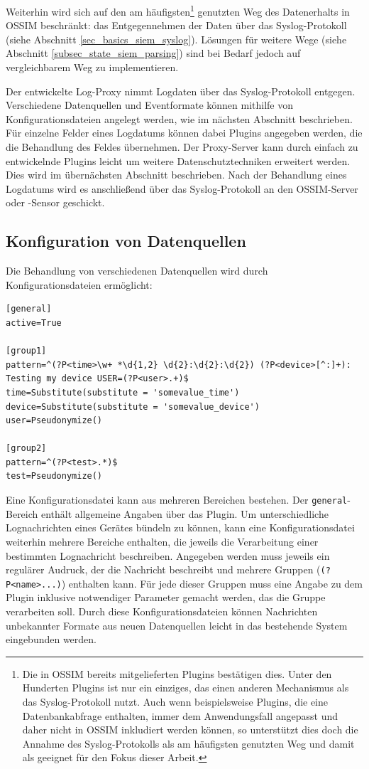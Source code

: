 Weiterhin wird sich auf den am häufigsten\footnote{
  Die in OSSIM bereits mitgelieferten Plugins bestätigen dies. Unter den Hunderten Plugins ist nur ein einziges, das einen anderen Mechanismus als das Syslog-Protokoll nutzt. Auch wenn beispielsweise Plugins, die eine Datenbankabfrage enthalten, immer dem Anwendungsfall angepasst und daher nicht in OSSIM inkludiert werden können, so unterstützt dies doch die Annahme des Syslog-Protokolls als am häufigsten genutzten Weg und damit als geeignet für den Fokus dieser Arbeit.
} genutzten Weg des Datenerhalts in OSSIM beschränkt: das Entgegennehmen der Daten über das Syslog-Protokoll (siehe Abschnitt \ref{sec_basics_siem_syslog}). Lösungen für weitere Wege (siehe Abschnitt \ref{subsec_state_siem_parsing}) sind bei Bedarf jedoch auf vergleichbarem Weg zu implementieren.

Der entwickelte Log-Proxy nimmt Logdaten über das Syslog-Protokoll entgegen. Verschiedene Datenquellen und Eventformate können mithilfe von Konfigurationsdateien angelegt werden, wie im nächsten Abschnitt beschrieben. Für einzelne Felder eines Logdatums können dabei Plugins angegeben werden, die die Behandlung des Feldes übernehmen. Der Proxy-Server kann durch einfach zu entwickelnde Plugins leicht um weitere Datenschutztechniken erweitert werden. Dies wird im übernächsten Abschnitt beschrieben. Nach der Behandlung eines Logdatums wird es anschließend über das Syslog-Protokoll an den OSSIM-Server oder -Sensor geschickt.

\subsection{Konfiguration von Datenquellen}
\label{sec_integration_in_ossim_datasource_config}

Die Behandlung von verschiedenen Datenquellen wird durch Konfigurationsdateien ermöglicht:

\begin{lstlisting}[morekeywords={general,active,pattern,group1,group2}]
[general]
active=True

[group1]
pattern=^(?P<time>\w+ *\d{1,2} \d{2}:\d{2}:\d{2}) (?P<device>[^:]+): Testing my device USER=(?P<user>.+)$
time=Substitute(substitute = 'somevalue_time')
device=Substitute(substitute = 'somevalue_device')
user=Pseudonymize()

[group2]
pattern=^(?P<test>.*)$
test=Pseudonymize()
\end{lstlisting}

Eine Konfigurationsdatei kann aus mehreren Bereichen bestehen. Der \texttt{general}-Bereich enthält allgemeine Angaben über das Plugin. Um unterschiedliche Lognachrichten eines Gerätes bündeln zu können, kann eine Konfigurationsdatei weiterhin mehrere Bereiche enthalten, die jeweils die Verarbeitung einer bestimmten Lognachricht beschreiben. Angegeben werden muss jeweils ein regulärer Audruck, der die Nachricht beschreibt und mehrere Gruppen (\texttt{(?P<name>...)}) enthalten kann. Für jede dieser Gruppen muss eine Angabe zu dem Plugin inklusive notwendiger Parameter gemacht werden, das die Gruppe verarbeiten soll. Durch diese Konfigurationsdateien können Nachrichten unbekannter Formate aus neuen Datenquellen leicht in das bestehende System eingebunden werden.

